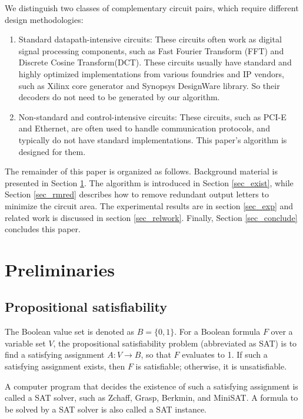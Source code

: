 \documentclass[journal]{IEEEtran}
\begin{document}
We distinguish two classes of complementary circuit pairs,
  which require different design methodologies:
\begin{enumerate}
  \item Standard datapath-intensive circuits:
  These circuits often work as digital signal processing components, such as
      Fast Fourier Transform (FFT) and
      Discrete Cosine Transform(DCT).
      These circuits usually have standard and highly optimized implementations from various foundries and IP vendors,
      such as Xilinx core generator\cite{CoreGen} and Synopsys DesignWare library\cite{DesignWare}.
      So their decoders do not need to be generated by our algorithm.
  \item Non-standard and control-intensive circuits:
  These circuits,
  such as PCI-E\cite{PCIESPEC} and Ethernet\cite{IEEE80232002},
  are often used to handle communication protocols,
  and typically do not have standard implementations.
      This paper's algorithm is designed for them.
\end{enumerate}


The remainder of this paper is organized as follows.
Background material is presented in Section \ref{sec_prem}.
The algorithm is introduced in Section \ref{sec_exist},
while Section \ref{sec_rmred} describes how to remove redundant output letters to minimize the circuit area.
The experimental results are in section \ref{sec_exp} and related work is discussed in section \ref{sec_relwork}.
Finally,
Section \ref{sec_conclude} concludes this paper.

\section{Preliminaries}\label{sec_prem}


\subsection{Propositional satisfiability}\label{subsec_SAT}
The Boolean value set is denoted as $B=\{0,1\}$.
For a Boolean formula $F$ over a variable set $V$,
the propositional satisfiability problem (abbreviated as SAT) is to find a satisfying assignment $A:V\to B$,
so that $F$ evaluates to 1.
If such a satisfying assignment exists, then $F$ is satisfiable;
otherwise,
it is unsatisfiable.

A computer program that decides the existence of such a satisfying assignment is called a SAT solver,
such as Zchaff\cite{CHAFF}, Grasp\cite{grasp}, Berkmin\cite{BERKMIN},
and MiniSAT\cite{EXTSAT}.
A formula to be solved by a SAT solver is also called a SAT instance.
\end{document}
